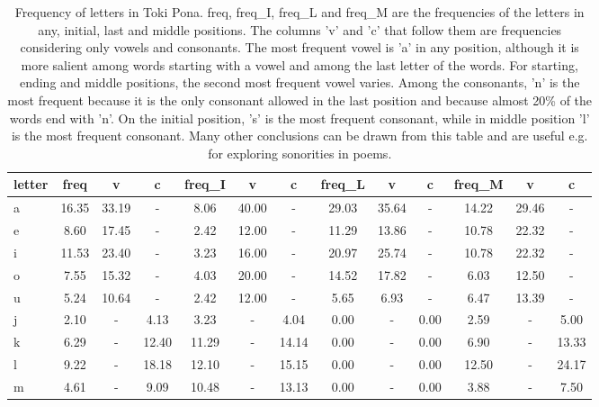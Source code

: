 \begin{table*}[h]
\scriptsize
\begin{center}
\caption{Frequency of letters in Toki Pona.
            freq, freq\_I, freq\_L and freq\_M are
            the frequencies of the letters in any, initial, last and middle
            positions.
            The columns 'v' and 'c' that follow them are frequencies
            considering only vowels and consonants.
            The most frequent vowel is 'a' in any position,
            although it is more salient among words starting with a vowel
            and among the last letter of the words.
            For starting, ending and middle positions, the second most frequent
            vowel varies.
            Among the consonants, 'n' is the most frequent because it is
            the only consonant allowed in the last position and because
            almost 20\% of the words end with 'n'.
            On the initial position, 's' is the most frequent consonant,
            while in middle position 'l' is the most frequent consonant.
            Many other conclusions can be drawn from this table and are
            useful e.g. for exploring sonorities in poems.}\label{freqLet}
\hspace*{-1.3cm}
\begin{tabular}{  l | c   c   c | c   c   c | c   c   c | c   c   c  }
letter & freq  & v  & c  & freq\_I  & v  & c  & freq\_L  & v  & c  & freq\_M  & v  & c \\\hline
a & 16.35  & 33.19  & -  & 8.06  & 40.00  & -  & 29.03  & 35.64  & -  & 14.22  & 29.46  & - \\
e & 8.60  & 17.45  & -  & 2.42  & 12.00  & -  & 11.29  & 13.86  & -  & 10.78  & 22.32  & - \\
i & 11.53  & 23.40  & -  & 3.23  & 16.00  & -  & 20.97  & 25.74  & -  & 10.78  & 22.32  & - \\
o & 7.55  & 15.32  & -  & 4.03  & 20.00  & -  & 14.52  & 17.82  & -  & 6.03  & 12.50  & - \\
u & 5.24  & 10.64  & -  & 2.42  & 12.00  & -  & 5.65  & 6.93  & -  & 6.47  & 13.39  & - \\\hline
j & 2.10  & -  & 4.13  & 3.23  & -  & 4.04  & 0.00  & -  & 0.00  & 2.59  & -  & 5.00 \\
k & 6.29  & -  & 12.40  & 11.29  & -  & 14.14  & 0.00  & -  & 0.00  & 6.90  & -  & 13.33 \\
l & 9.22  & -  & 18.18  & 12.10  & -  & 15.15  & 0.00  & -  & 0.00  & 12.50  & -  & 24.17 \\\hline
m & 4.61  & -  & 9.09  & 10.48  & -  & 13.13  & 0.00  & -  & 0.00  & 3.88  & -  & 7.50 \\

\end{tabular}
\end{center}
\end{table*}
